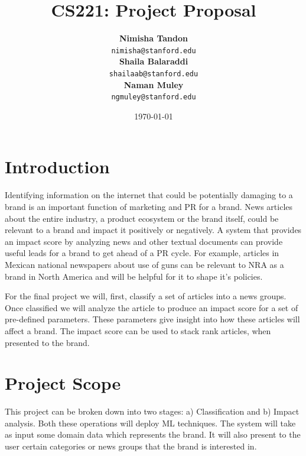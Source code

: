 \documentclass{article}
\title{CS221: Project Proposal} %
\author{	\textbf{Nimisha Tandon}\\  \texttt{nimisha@stanford.edu} \\
		\textbf{Shaila Balaraddi}\\  \texttt{shailaab@stanford.edu} \\ 
		\textbf{Naman Muley}\\      \texttt{ngmuley@stanford.edu}}
\date{\today} %
\begin{document}
\maketitle %


\section{Introduction} %

Identifying information on the internet that could be potentially damaging to a brand is an important function of marketing and PR for a brand. News articles about the entire industry, a product ecosystem or the brand itself, could be relevant to a brand and impact it positively or negatively. A system that provides an impact score by analyzing news and other textual documents can provide useful leads for a brand to get ahead of a PR cycle. For example, articles in Mexican national newspapers about use of guns can be relevant to NRA as a brand in North America and will be helpful for it to shape it's policies.

For the final project we will, first, classify a set of articles into a news groups. Once classified we will analyze the article to produce an impact score for a set of pre-defined parameters. These parameters give insight into how these articles will affect a brand. The impact score can be used to stack rank articles, when presented to the brand.  

\maketitle %

\section*{Project Scope} %

This project can be broken down into two stages: a) Classification and b) Impact analysis. Both these operations will deploy ML techniques. The system will take as input some domain data which represents the brand. It will also present to the user certain categories or news groups that the brand is interested in. 
\end{document}
